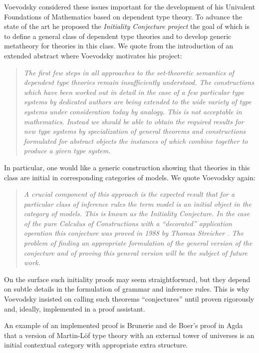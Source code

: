 \documentclass[11pt,a4paper]{article}
\theoremstyle{plain}
\theoremstyle{definition}
\begin{document}
Voevodsky considered these issues important for the development of his Univalent Foundations of Mathematics based on dependent type theory. To advance the state
of the art he proposed the {\em Initiality Conjecture project} the goal of which is to define a general class of dependent type theories and to develop generic metatheory for theories in this class. We quote from the introduction of an extended abstract where Voevodsky \cite{voevodsky:initiality} motivates his project:
\begin{quotation}
\emph{The first few steps in all approaches to the set-theoretic semantics of dependent
type theories remain insuﬃciently understood. The constructions which have been
worked out in detail in the case of a few particular type systems by dedicated authors
are being extended to the wide variety of type systems under consideration today by
analogy. This is not acceptable in mathematics. Instead we should be able to obtain
the required results for new type systems by specialization of general theorems and
constructions formulated for abstract objects the instances of which combine together
to produce a given type system.}
\end{quotation}
In particular, one would like a generic construction showing that theories in this class are initial in corresponding categories of models. We quote Voevodsky \cite{voevodsky:initiality} again:
\begin{quotation}
\emph{A crucial component of this approach is the expected result that for a particular
class of inference rules the term model is an initial object in the category of models.
This is known as the Initiality Conjecture. In the case of the pure Calculus of
Constructions with a “decorated” application operation this conjecture was proved in
1988 by Thomas Streicher \cite{streicher:thesis}. The problem of finding an appropriate formulation
of the general version of the conjecture and of proving this general version will be the
subject of future work.}
\end{quotation}
On the surface such initiality proofs may seem straightforward, but they depend on subtle details in the formulation of grammar and inference rules. This is why Voevodsky insisted on calling such theorems ``conjectures'' until proven rigorously and, ideally, implemented in a proof assistant.

An example of an implemented proof is Brunerie and de Boer's \cite{Brunerie:initiality,deBoer:lic} proof in Agda that a version of Martin-Löf type theory with an external tower of universes is an initial contextual category \cite{cartmell:phd,cartmell:apal} with appropriate extra structure. %
\end{document}
